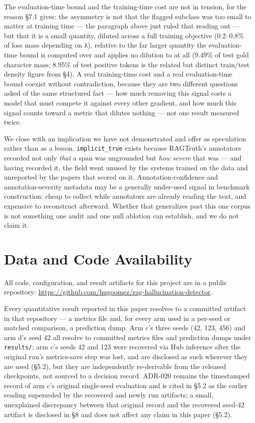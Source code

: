 \documentclass[11pt]{article}
\begin{document}
The evaluation-time bound and the training-time cost are not in tension, for the reason
§7.1 gives: the asymmetry is not that the flagged subclass was too small to matter at
training time --- the paragraph above just ruled that reading out --- but that it is a small
quantity, diluted across a full training objective (0.2--0.8\% of loss mass depending on λ),
relative to the far larger quantity the evaluation-time bound is computed over and applies
no dilution to at all (9.49\% of test gold character mass; 8.95\% of test positive tokens is
the related but distinct train/test density figure from §4). A real training-time cost and
a real evaluation-time bound coexist without contradiction, because they are two different
questions asked of the same structured fact --- how much removing this signal costs a model
that must compete it against every other gradient, and how much this signal counts toward a
metric that dilutes nothing --- not one result measured twice.

We close with an implication we have not demonstrated and offer as speculation rather than
as a lesson. \texttt{implicit\_true} exists because RAGTruth's annotators recorded not only \emph{that} a
span was ungrounded but \emph{how severe} that was --- and having recorded it, the field
went unused by the systems trained on the data and unreported by the papers that scored on
it. Annotation-confidence and annotation-severity metadata may be a generally under-used
signal in benchmark construction: cheap to collect while annotators are already reading the
text, and expensive to reconstruct afterward. Whether that generalizes past this one corpus
is not something one audit and one null ablation can establish, and we do not claim it.

\section{Data and Code Availability}\label{data-and-code-availability}

All code, configuration, and result artifacts for this project are in a public
repository: \url{https://github.com/hugoomez/rag-hallucination-detector}.

Every quantitative result reported in this paper resolves to a committed artifact in that
repository --- a metrics file and, for every arm used in a per-seed or matched comparison, a
prediction dump. Arm c's three seeds (42, 123, 456) and arm d's seed 42 all resolve to
committed metrics files and prediction dumps under \texttt{results/}; arm c's seeds 42 and 123 were
recovered via Hub inference after the original run's metrics-save step was lost, and are
disclosed as such wherever they are used (§5.2), but they are independently re-derivable
from the released checkpoints, not sourced to a decision record. ADR-020 remains the
timestamped record of arm c's original single-seed evaluation and is cited in §5.2 as the
earlier reading superseded by the recovered and newly run artifacts; a small, unexplained
discrepancy between that original record and the recovered seed-42 artifact is disclosed in
§8 and does not affect any claim in this paper (§5.2).
\end{document}
